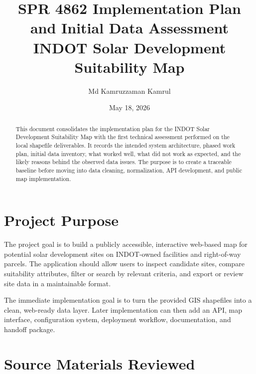 \documentclass[11pt]{article}
\title{\textbf{SPR 4862 Implementation Plan and Initial Data Assessment}\\
\large INDOT Solar Development Suitability Map}
\author{Md Kamruzzaman Kamrul}
\date{May 18, 2026}
\begin{document}
\maketitle

\begin{abstract}
This document consolidates the implementation plan for the INDOT Solar Development
Suitability Map with the first technical assessment performed on the local shapefile
deliverables. It records the intended system architecture, phased work plan, initial
data inventory, what worked well, what did not work as expected, and the likely
reasons behind the observed data issues. The purpose is to create a traceable baseline
before moving into data cleaning, normalization, API development, and public map
implementation.
\end{abstract}

\tableofcontents
\newpage

\section{Project Purpose}

The project goal is to build a publicly accessible, interactive web-based map for
potential solar development sites on INDOT-owned facilities and right-of-way parcels.
The application should allow users to inspect candidate sites, compare suitability
attributes, filter or search by relevant criteria, and export or review site data in
a maintainable format.

The immediate implementation goal is to turn the provided GIS shapefiles into a clean,
web-ready data layer. Later implementation can then add an API, map interface,
configuration system, deployment workflow, documentation, and handoff package.

\section{Source Materials Reviewed}
\end{document}
